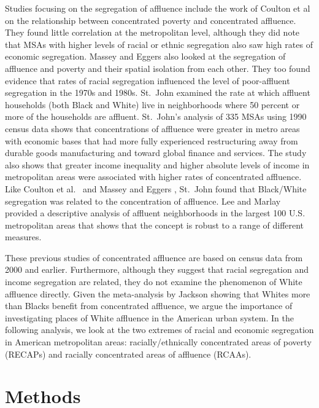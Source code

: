 \documentclass[11pt,]{article}
\begin{document}
Studies focusing on the segregation of affluence include the work of
Coulton et al \autocite*{coulton1996} on the relationship between
concentrated poverty and concentrated affluence. They found little
correlation at the metropolitan level, although they did note that MSAs
with higher levels of racial or ethnic segregation also saw high rates
of economic segregation. Massey and Eggers \autocite*{massey1993} also
looked at the segregation of affluence and poverty and their spatial
isolation from each other. They too found evidence that rates of racial
segregation influenced the level of poor-affluent segregation in the
1970s and 1980s. St.~John \autocite*{stjohn1999} examined the rate at
which affluent households (both Black and White) live in neighborhoods
where 50 percent or more of the households are affluent. St.~John's
analysis of 335 MSAs using 1990 census data shows that concentrations of
affluence were greater in metro areas with economic bases that had more
fully experienced restructuring away from durable goods manufacturing
and toward global finance and services. The study also shows that
greater income inequality and higher absolute levels of income in
metropolitan areas were associated with higher rates of concentrated
affluence. Like Coulton et al.~\autocite*{coulton1996} and Massey and
Eggers \autocite*{massey1993}, St.~John found that Black/White
segregation was related to the concentration of affluence. Lee and
Marlay \autocite*{lee2007right} provided a descriptive analysis of
affluent neighborhoods in the largest 100 U.S. metropolitan areas that
shows that the concept is robust to a range of different measures.

These previous studies of concentrated affluence are based on census
data from 2000 and earlier. Furthermore, although they suggest that
racial segregation and income segregation are related, they do not
examine the phenomenon of White affluence directly. Given the
meta-analysis by Jackson \autocite*{jackson2000relation} showing that
Whites more than Blacks benefit from concentrated affluence, we argue
the importance of investigating places of White affluence in the
American urban system. In the following analysis, we look at the two
extremes of racial and economic segregation in American metropolitan
areas: racially/ethnically concentrated areas of poverty (RECAPs) and
racially concentrated areas of affluence (RCAAs).

\hypertarget{methods}{%
\section{Methods}\label{methods}}
\end{document}
